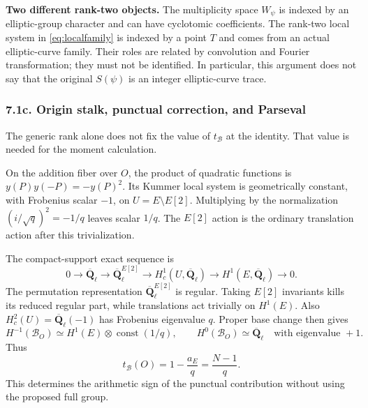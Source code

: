 \documentclass[
  11pt,
  a4paper,
]{article}
\newcommand{\Q}{\overline{\mathbf Q}_{\ell}}
\newcommand{\const}{\operatorname{const}}
\newcommand{\B}{\mathcal B}
\begin{document}
\textbf{Two different rank-two objects.} The multiplicity space $W_\psi$ is indexed by an elliptic-group character and can have cyclotomic coefficients. The rank-two local system in \eqref{eq:localfamily} is indexed by a point $T$ and comes from an actual elliptic-curve family. Their roles are related by convolution and Fourier transformation; they must not be identified. In particular, this argument does not say that the original $S(\psi)$ is an integer elliptic-curve trace.

\subsubsection{7.1c. Origin stalk, punctual correction, and Parseval}
The generic rank alone does not fix the value of $t_{\B}$ at the identity. That value is needed for the moment calculation.

On the addition fiber over $O$, the product of quadratic functions is $y(P)y(-P)=-y(P)^2$. Its Kummer local system is geometrically constant, with Frobenius scalar $-1$, on $U=E\setminus E[2]$. Multiplying by the normalization $(i/\sqrt q)^2=-1/q$ leaves scalar $1/q$. The $E[2]$ action is the ordinary translation action after this trivialization.

The compact-support exact sequence is
\begin{equation}\label{eq:openexact}
 0\longrightarrow\Q\longrightarrow\Q^{E[2]}
 \longrightarrow H_c^1(U,\Q)
 \longrightarrow H^1(E,\Q)\longrightarrow0.
\end{equation}
The permutation representation $\Q^{E[2]}$ is regular. Taking $E[2]$ invariants kills its reduced regular part, while translations act trivially on $H^1(E)$. Also $H_c^2(U)=\Q(-1)$ has Frobenius eigenvalue $q$. Proper base change then gives
\begin{equation}\label{eq:originstalk}
 H^{-1}(\B_O)\simeq H^1(E)\otimes\const(1/q),\qquad
 H^0(\B_O)\simeq\Q\quad\text{with eigenvalue }+1.
\end{equation}
Thus
\begin{equation}\label{eq:origintrace}
 \boxed{t_{\B}(O)=1-\frac{a_E}{q}=\frac{N-1}{q}.}
\end{equation}
This determines the arithmetic sign of the punctual contribution without using the proposed full group.
\end{document}
